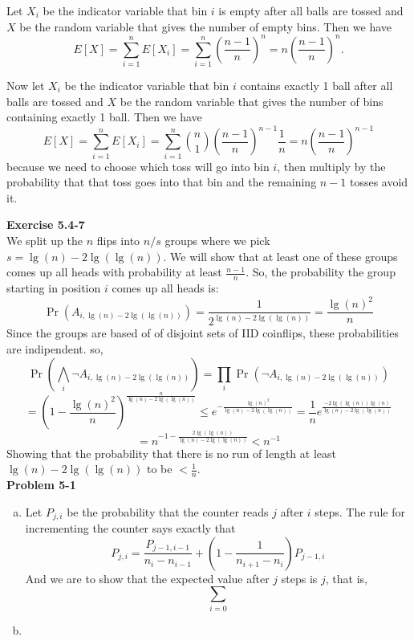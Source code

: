 \documentclass{article}
\begin{document}
Let $X_i$ be the indicator variable that bin $i$ is empty after all balls are tossed and $X$ be the random variable that gives the number of empty bins.  Then we have
\[ E[X] = \sum_{i=1}^n E[X_i] = \sum_{i=1}^n \left(\frac{n-1}{n}\right)^n = n\left(\frac{n-1}{n}\right)^n.\]

Now let $X_i$ be the indicator variable that bin $i$ contains exactly 1 ball after all balls are tossed and $X$ be the random variable that gives the number of bins containing exactly 1 ball.  Then we have
\[ E[X] = \sum_{i=1}^n E[X_i] = \sum_{i=1}^n {n \choose 1}\left(\frac{n-1}{n}\right)^{n-1}\frac{1}{n} = n\left(\frac{n-1}{n}\right)^{n-1} \]
because we need to choose which toss will go into bin $i$, then multiply by the probability that that toss goes into that bin and the remaining $n-1$ tosses avoid it.

\noindent\textbf{Exercise 5.4-7}\\

We split up the $n$ flips into $n/s$ groups where we pick $s = \lg(n) - 2\lg(\lg(n))$. We will show that at least one of these groups comes up all heads with probability at least $\frac{n-1}{n}$. So, the probability the group starting in position $i$ comes up all heads is:
\[
\Pr(A_{i,\lg(n)- 2\lg(\lg(n))}) =\frac{1}{2^{\lg(n)- 2\lg(\lg(n))}} = \frac{\lg(n)^2}{n}
\]
Since the groups are based of of disjoint sets of IID coinflips, these probabilities are indipendent. so, 
\[
\Pr(\bigwedge_{i} \neg A_{i,\lg(n)- 2\lg(\lg(n))}) = \prod_i \Pr(\neg A_{i,\lg(n)- 2\lg(\lg(n))}) \]\[= \left(1 - \frac{\lg(n)^2}{n}\right)^{\frac{n}{\lg(n) - 2\lg(\lg(n))}} \le e^{-\frac{\lg(n)^2}{\lg(n) - 2\lg(\lg(n))}} = \frac{1}{n}e^{\frac{-2\lg(\lg(n))\lg(n)}{\lg(n) - 2\lg(\lg(n))}} 
\]
\[
= n^{-1 - \frac{2\lg(\lg(n))}{\lg(n) - 2\lg(\lg(n))}} < n^{-1}
\]
Showing that the probability that there is no run of length at least $\lg(n) - 2\lg(\lg(n))$ to be $<\frac{1}{n}$.\\


\noindent\textbf{Problem 5-1}\\

\begin{enumerate}[a)]
\item
Let $P_{j,i}$ be the probability that the counter reads $j$ after $i$ steps. The rule for incrementing the counter says exactly that
\[
P_{j,i} = \frac{P_{j-1,i-1}}{n_{i} - n_{i-1}} + \left( 1 - \frac{1}{n_{i+1} - n_i}\right)P_{j-1,i} 
\]
And we are to show that the expected value after $j$ steps is $j$, that is,
\[
\sum_{i=0}
\]

\item

\end{enumerate}
\end{document}

